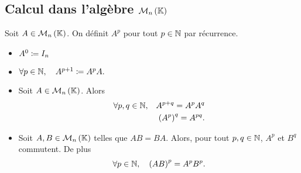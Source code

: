 \documentclass{magnolia}
\begin{document}




\subsection{Calcul dans l'algèbre $\mathcal{M}_{n}\left(\mathbb{K}\right)$}


\begin{definition}
  Soit $A\in\mathcal{M}_{n}\left(\mathbb{K}\right)$. On définit $A^p$ pour tout $p\in\mathbb{N}$ par récurrence.
  \begin{itemize}
  \item $A^0\coloneqq I_n$
  \item $\forall p\in\mathbb{N},\quad A^{p+1}\coloneqq A^p A.$
  \end{itemize}
  \end{definition}
  
  \begin{proposition}
  \begin{itemize}
  \item Soit $A\in\mathcal{M}_{n}\left(\mathbb{K}\right)$. Alors
  \begin{eqnarray*}
  \forall p,q\in\mathbb{N}, & & A^{p+q}=A^p A^q\\
                   & & \left(A^p\right)^q=A^{pq}.
  \end{eqnarray*}
  \item Soit $A,B\in \mathcal{M}_{n}\left(\mathbb{K}\right)$ telles que $AB=BA$. Alors, pour tout $p,q\in\mathbb{N}$, $A^p$ et $B^q$ commutent. De plus
  \[\forall p\in\mathbb{N} ,\quad \left(A B\right)^p=A^p B^p.\]
  \end{itemize}
  \end{proposition}
\end{document}
